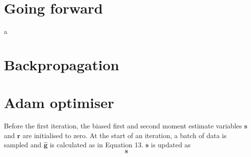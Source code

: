\documentclass[12pt]{article}
\begin{document}
\section{Going forward}
a



\appendix
\appendixpage
\section{Backpropagation}
\section{Adam optimiser}
Before the first iteration, the biased first and second moment estimate variables $\bm{s}$ and $\bm{r}$ are initialised to zero. At the start of an iteration, a batch of data is sampled and $\hat{\bm{g}}$ is calculated as in Equation 13. $\bm{s}$ is updated as
\begin{equation}
\bm{s}
\end{equation}        
\end{document}
